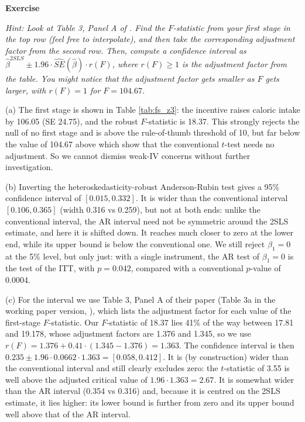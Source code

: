\documentclass[10pt]{article}
\newcounter{exercise}
\newenvironment{exercise}%
{%
	\refstepcounter{exercise}%
	\textbf{Exercise \theexercise}%
	}%
{
 \par\vspace{\baselineskip}%
\noindent\ignorespacesafterend
}
\begin{document}
\begin{exercise}
\begin{enumerate}
		\textit{Hint: Look at Table 3, Panel A of \citet{lee2022}. Find the $F$-statistic from your first stage in the top row (feel free to interpolate), and then take the corresponding adjustment factor from the second row. Then, compute a confidence interval as $\hat{\beta}^{2SLS} \pm 1.96 \cdot \widehat{SE}(\hat{\beta}) \cdot r(F)$, where $r(F) \geq 1$ is the adjustment factor from the table. You might notice that the adjustment factor gets smaller as $F$ gets larger, with $r(F)=1$ for $F=104.67$.}

		\color{red}
		(a) The first stage is shown in Table \ref{tab:fs_z3}: the incentive raises caloric intake by 106.05 (SE 24.75), and the robust $F$-statistic is 18.37. This strongly rejects the null of no first stage and is above the rule-of-thumb threshold of 10, but far below the value of 104.67 above which \citet{lee2022} show that the conventional $t$-test needs no adjustment. So we cannot dismiss weak-IV concerns without further investigation.

		(b) Inverting the heteroskedasticity-robust Anderson-Rubin test gives a 95\% confidence interval of $[0.015, 0.332]$. It is wider than the conventional interval $[0.106, 0.365]$ (width 0.316 vs 0.259), but not at both ends: unlike the conventional interval, the AR interval need not be symmetric around the 2SLS estimate, and here it is shifted down. It reaches much closer to zero at the lower end, while its upper bound is below the conventional one. We still reject $\beta_1 = 0$ at the 5\% level, but only just: with a single instrument, the AR test of $\beta_1 = 0$ is the test of the ITT, with $p = 0.042$, compared with a conventional $p$-value of 0.0004.

		(c) For the \citet{lee2022} interval we use Table 3, Panel A of their paper (Table 3a in the working paper version, \citealp{lee2021wp}), which lists the adjustment factor for each value of the first-stage $F$-statistic. Our $F$-statistic of 18.37 lies 41\% of the way between 17.81 and 19.178, whose adjustment factors are 1.376 and 1.345, so we use $r(F) = 1.376 + 0.41 \cdot (1.345 - 1.376) = 1.363$. The confidence interval is then $0.235 \pm 1.96 \cdot 0.0662 \cdot 1.363 = [0.058, 0.412]$. It is (by construction) wider than the conventional interval and still clearly excludes zero: the $t$-statistic of 3.55 is well above the adjusted critical value of $1.96 \cdot 1.363 = 2.67$. It is somewhat wider than the AR interval (0.354 vs 0.316) and, because it is centred on the 2SLS estimate, it lies higher: its lower bound is further from zero and its upper bound well above that of the AR interval.


\end{enumerate}
\end{exercise}
\end{document}

